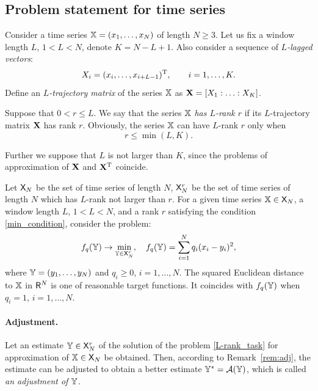 \documentclass[sii]{ipart}
\begin{document}
\subsection{Problem statement for time series}
\label{sec:ts}
Consider a time series $\mathbb{X} = (x_1, \ldots, x_N)$ of length $N \ge 3$. Let us fix a window length $L$, $1 < L < N$, denote $K = N - L + 1$. Also consider a sequence of \emph{$L$-lagged vectors}:
\begin{equation}\label{l_lagged}
X_i = (x_i, \ldots, x_{i + L - 1})^\rmT, \qquad i = 1, \ldots, K.
\end{equation}
Define an \emph{$L$-trajectory matrix} of the series $\mathbb{X}$ as $\mathbf{X} = [X_1:\ldots:X_K]$.

Suppose that $0 < r \le L$. We say that the series $\mathbb{X}$ \emph{has $L$-rank $r$} if its $L$-trajectory matrix $\mathbf{X}$ has rank $r$.
Obviously, the series $\mathbb{X}$ can have $L$-rank $r$ only when
\begin{equation}
r \le \min(L, K). \label{min_condition}
\end{equation}

Further we suppose that $L$ is not larger than $K$, since the problems of approximation of $\mathbf{X}$ and $\mathbf{X}^{\mathrm{T}}$ coincide.

Let $\mathsf{X}_N$ be the set of time series of length $N$, $\mathsf{X}_N^r$ be the set of time series of length $N$ which has $L$-rank not larger than $r$. For a given time series $\mathbb{X} \in \mathsf{X}_N$, a window length $L$, $1 < L < N$, and a rank $r$ satisfying the condition \eqref{min_condition}, consider the problem:
\begin{equation} \label{L-rank_task}
f_q(\tsY) \to \min_{\tsY \in \sfX_N^r}, \quad f_q(\tsY) = \sum \limits_{i=1}^N q_i(x_i - y_i)^2,
\end{equation}
where $\mathbb{Y} = (y_1, \ldots, y_N)$ and
$q_i \ge 0$, $i = 1, \ldots, N$. The squared Euclidean distance to $\mathbb{X}$ in $\mathsf{R}^N$ is one of reasonable target functions. It coincides with $f_q(\mathbb{Y})$ when $q_i = 1$, $i = 1, \ldots, N$.

\paragraph*{Adjustment.} Let an estimate $\mathbb{Y} \in \mathsf{X}_N^r$ of the solution of the problem \eqref{L-rank_task} for approximation of $\mathbb{X} \in \mathsf{X}_N$ be obtained. Then, according to Remark~\ref{rem:adj}, the estimate can be adjusted to obtain a better estimate $\mathbb{Y}^*=\mathcal{A}(\mathbb{Y})$, which is called \emph{an adjustment of $\mathbb{Y}$}.
\end{document}
